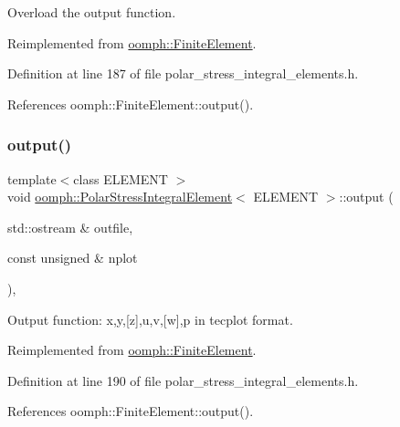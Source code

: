 Overload the output function. 



Reimplemented from \hyperlink{classoomph_1_1FiniteElement_a2ad98a3d2ef4999f1bef62c0ff13f2a7}{oomph\+::\+Finite\+Element}.



Definition at line 187 of file polar\+\_\+stress\+\_\+integral\+\_\+elements.\+h.



References oomph\+::\+Finite\+Element\+::output().

\mbox{\label{classoomph_1_1PolarStressIntegralElement_ab142fd67c65361764d9496e6ec0363a1}} 
\subsubsection{\texorpdfstring{output()}{output()}\hspace{0.1cm}{\footnotesize\ttfamily [2/2]}}
{\footnotesize\ttfamily template$<$class E\+L\+E\+M\+E\+NT $>$ \\
void \hyperlink{classoomph_1_1PolarStressIntegralElement}{oomph\+::\+Polar\+Stress\+Integral\+Element}$<$ E\+L\+E\+M\+E\+NT $>$\+::output (\begin{DoxyParamCaption}\item[{std\+::ostream \&}]{outfile,  }\item[{const unsigned \&}]{nplot }\end{DoxyParamCaption})\hspace{0.3cm}{\ttfamily [inline]}, {\ttfamily [virtual]}}



Output function\+: x,y,\mbox{[}z\mbox{]},u,v,\mbox{[}w\mbox{]},p in tecplot format. 



Reimplemented from \hyperlink{classoomph_1_1FiniteElement_afa9d9b2670f999b43e6679c9dd28c457}{oomph\+::\+Finite\+Element}.



Definition at line 190 of file polar\+\_\+stress\+\_\+integral\+\_\+elements.\+h.



References oomph\+::\+Finite\+Element\+::output().

